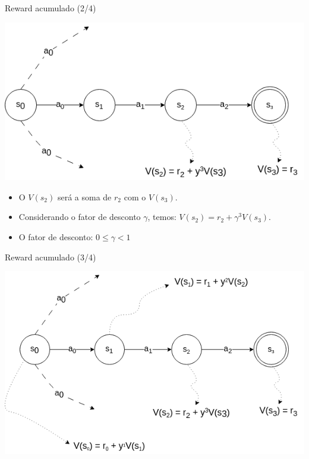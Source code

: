 \documentclass{beamer}
\begin{document}
\begin{frame}{Reward acumulado (2/4)}
	
	\begin{center}
		\includegraphics[width=.8\textwidth]{figuras/grafo_rewards_2.png}
	\end{center}
	
	\begin{itemize}	
		\item O $V(s_{2})$ será a soma de $r_{2}$ com o $V(s_{3})$. 
		\item Considerando o fator de desconto $\gamma$, temos: $V(s_{2}) = r_{2} + \gamma^{3} V(s_{3}) $.
		\item O fator de desconto: $0 \leq \gamma < 1$ 
	\end{itemize}
	
\end{frame}

\begin{frame}{Reward acumulado (3/4)}

\begin{center}
	\includegraphics[width=.9\textwidth]{figuras/grafo_rewards_3.png}
\end{center}

\end{frame}
\end{document}
